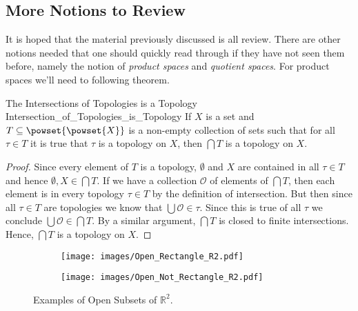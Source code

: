 \documentclass{book}                                                           %
\begin{document}
            \subsection{More Notions to Review}
                It is hoped that the material previously discussed is all
                review. There are other notions needed that one should quickly
                read through if they have not seen them before, namely the
                notion of \textit{product spaces} and \textit{quotient spaces}.
                For product spaces we'll need to following theorem.
                \begin{ltheorem}{The Intersections of Topologies is a Topology}
                                {Intersection_of_Topologies_is_Topology}
                    If $X$ is a set and $T\subseteq\powset{\powset{X}}$ is a
                    non-empty collection of sets such that for all $\tau\in{T}$
                    it is true that $\tau$ is a topology on $X$, then
                    $\bigcap{T}$ is a topology on $X$.
                \end{ltheorem}
                \begin{proof}
                    Since every element of $T$ is a topology, $\emptyset$ and
                    $X$ are contained in all $\tau\in{T}$ and hence
                    $\emptyset,X\in\bigcap{T}$. If we have a collection
                    $\mathcal{O}$ of elements of $\bigcap{T}$, then each element
                    is in every topology $\tau\in{T}$ by the definition of
                    intersection. But then since all $\tau\in{T}$ are topologies
                    we know that $\bigcup\mathcal{O}\in\tau$. Since this is true
                    of all $\tau$ we conclude $\bigcup\mathcal{O}\in\bigcap{T}$.
                    By a similar argument, $\bigcap{T}$ is closed to finite
                    intersections. Hence, $\bigcap{T}$ is a topology on $X$.
                \end{proof}
                \begin{figure}
                    \centering
                    \captionsetup{type=figure}
                    \begin{subfigure}[b]{0.49\textwidth}
                        \centering
                        \texttt{[image: images/Open\_Rectangle\_R2.pdf]}
                        \label{fig:Open_Rectangle_in_R2}
                    \end{subfigure}
                    \begin{subfigure}[b]{0.49\textwidth}
                        \centering
                        \texttt{[image: images/Open\_Not\_Rectangle\_R2.pdf]}
                        \label{fig:Open_Subset_Not_Product}
                    \end{subfigure}
                    \caption{Examples of Open Subsets of $\mathbb{R}^{2}$.}
                    \label{fig:Point_Set_Top_Open_Subsets_R2}
                \end{figure}
\end{document}
